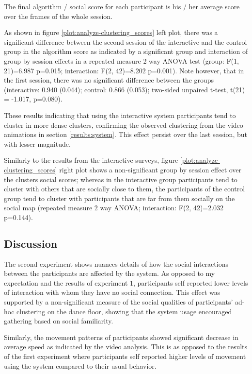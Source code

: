 \documentclass[a4paper,11pt]{article}
\begin{document}
{The final algorithm / social score for each participant is his / her average score over the frames of the whole session.

As shown in figure \ref{plot:analyze-clustering_scores} left plot, there was a significant difference between the second session of the interactive and the control group in the algorithm score as indicated by a significant group and interaction of group by session effects in a repeated measure 2 way ANOVA test (group: F(1, 21)=6.987 p=0.015; interaction: F(2, 42)=8.202 p=0.001).
Note however, that in the first session, there was no significant difference between the groups (interactive: 0.940 (0.044); control: 0.866 (0.053); two-sided unpaired t-test, t(21) = -1.017, p=0.080).

These results indicating that using the interactive system participants tend to cluster in more dense clusters, confirming the observed clustering from the video animations in section \ref{results:system}.
This effect persist over the last session, but with lesser magnitude.

Similarly to the results from the interactive surveys, figure \ref{plot:analyze-clustering_scores} right plot shows a non-significant group by session effect over the clusters social scores; whereas in the interactive group participants tend to cluster with others that are socially close to them, the participants of the control group tend to cluster with participants that are far from them socially on the social map (repeated measure 2 way ANOVA; interaction: F(2, 42)=2.032 p=0.144).

\subsection{Discussion}

The second experiment shows nuances details of how the social interactions between the participants are affected by the system.
As opposed to my expectation and the results of experiment 1, participants self reported lower levels of interaction with whom they have no social connection.
This effect was supported by a non-significant measure of the social qualities of participants' ad-hoc clustering on the dance floor, showing that the system usage encouraged gathering based on social familiarity.

Similarly, the movement patterns of participants showed significant decrease in average speed as indicated by the video analysis.
This is as opposed to the results of the first experiment where participants self reported higher levels of movement using the system compared to their usual behavior.

}
\end{document}
